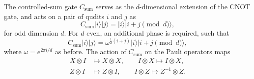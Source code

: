 \documentclass[12pt,a4paper]{article}
\def\ket#1{{|{#1}\rangle}}
\begin{document}
The controlled-sum gate $C_{\mathrm{sum}}$ serves as the $d$-dimensional extension of the CNOT gate, and acts on a pair of qudits $i$ and $j$ as
%
\begin{equation}\label{CSum}
C_{\mathrm{sum}}\ket{i}\ket{j} = \ket{i}\ket{i+j \pmod{d}},
\end{equation}
%
for odd dimension $d$. For $d$ even, an additional phase is required, such that
%
\begin{equation}\label{CSumEven}
C_{\mathrm{sum}}\ket{i}\ket{j} = \omega^{\frac{1}{2}(i+j)}\ket{i}\ket{i+j \pmod{d}},
\end{equation}
%
where $\omega = e^{2\pi i/d}$ as before. The action of $C_{\mathrm{sum}}$ on the Pauli operators maps
%
\begin{equation}\label{CSumMapping}
\begin{split}
X \otimes I &\mapsto X \otimes X, \qquad I \otimes X \mapsto I \otimes X,\\
Z \otimes I &\mapsto Z \otimes I, \qquad I \otimes Z \mapsto Z^{-1} \otimes Z.
\end{split}
\end{equation}
%
\end{document}
